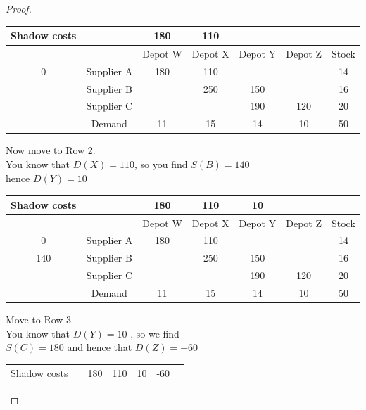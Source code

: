 \documentclass[a4paper]{article}
\begin{document}
\begin{eg}
\begin{proof}
		\begin{center}
			\begin{tabular}{|c|c|c|c|c|c|c|}
				\hline
				Shadow costs &            & 180     & 110     &         &         &       \\
				\hline
				             &            & Depot W & Depot X & Depot Y & Depot Z & Stock \\
				\hline
				0            & Supplier A & 180     & 110     &         &         & 14    \\
				\hline
				             & Supplier B &         & 250     & 150     &         & 16    \\
				\hline
				             & Supplier C &         &         & 190     & 120     & 20    \\
				\hline
				             & Demand     & 11      & 15      & 14      & 10      & 50    \\
				\hline
			\end{tabular}
		\end{center}
		Now move to Row 2. \\
		You know that $D(X)=110$, so you find $S(B)=140$ \\
		hence $D(Y)=10$
		\begin{center}
			\begin{tabular}{|c|c|c|c|c|c|c|}
				\hline
				Shadow costs &            & 180     & 110     & 10      &         &       \\
				\hline
				             &            & Depot W & Depot X & Depot Y & Depot Z & Stock \\
				\hline
				0            & Supplier A & 180     & 110     &         &         & 14    \\
				\hline
				140          & Supplier B &         & 250     & 150     &         & 16    \\
				\hline
				             & Supplier C &         &         & 190     & 120     & 20    \\
				\hline
				             & Demand     & 11      & 15      & 14      & 10      & 50    \\
				\hline
			\end{tabular}
		\end{center}
		Move to Row 3 \\
		You know that $D(Y)=10$ , so we find \\
		$S(C) = 180$ and hence that $D(Z)=-60$
		\begin{center}
			\begin{tabular}{|c|c|c|c|c|c|c|}
				\hline
				Shadow costs &            & 180     & 110     & 10      & -60     &       \\

\end{tabular}
\end{center}
\end{proof}
\end{eg}
\end{document}
